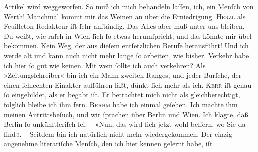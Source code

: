 \begin{ledgroupsized}[t]{13cm}
               Artikel wird weggeworfen.  So muß ich mich
               behandeln laſſen, ich, ein Menſch von Werth! Manchmal kommt mir das Weinen an über
               die Erniedrigung.\pend
           \pstart
           \textsc{Herzl} als Feuilleton-Redakteur
               iſt ſehr anſtändig. Das Alles aber muß unter uns bleiben. Du weißt, wie raſch in Wien ſich ſo etwas herumſpricht; und das könnte mir
               übel bekommen.\pend
           \pstart
           Kein Weg, der aus dieſem entſetzlichen Berufe herausführt! Und ich werde alt und kann
               auch nicht mehr lange ſo arbeiten, wie bisher.\pend
           \pstart
           Verkehr habe ich hier ſo gut wie keinen. {\pb}Mit wem
               ſollte ich auch verkehren? Als »Zeitungsſchreiber« bin ich ein Mann zweiten Ranges,
               und jeder Burſche, der einen ſchlechten Einakter aufführen läßt, dünkt ſich mehr als
               ich. \textsc{Kerr} iſt genau ſo eingebildet, als er begabt iſt. Er betrachtet mich nicht als
               gleichberechtigt, folglich bleibe ich ihm fern. \textsc{Brahm} habe ich einmal geſehen. Ich machte ihm meinen Antrittsbeſuch, und  wir ſprachen über Berlin und Wien. Ich klagte, daß Berlin ſo unkünſtleriſch ſei. – »Nun, das wird ſich jetzt wohl
               beſſern, wo Sie da ſind«. – Seitdem bin ich natürlich nicht mehr wiedergekommen. Der
               einzig angenehme literariſche Menſch, den ich hier kennen gelernt habe, iſt \label{K_L02907-6v}
\end{ledgroupsized}
